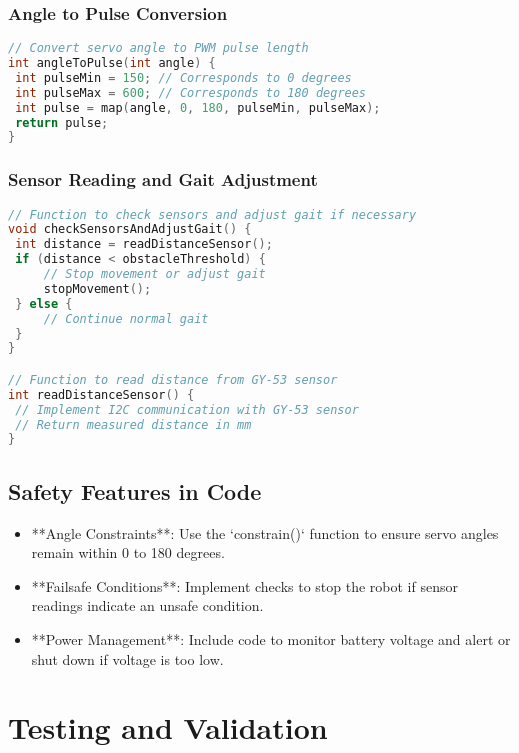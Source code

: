 \documentclass{article}
\begin{document}
\subsubsection{Angle to Pulse Conversion}

\begin{lstlisting}[language=C++, caption=Angle to Pulse Conversion]
// Convert servo angle to PWM pulse length
int angleToPulse(int angle) {
 int pulseMin = 150; // Corresponds to 0 degrees
 int pulseMax = 600; // Corresponds to 180 degrees
 int pulse = map(angle, 0, 180, pulseMin, pulseMax);
 return pulse;
}
\end{lstlisting}

\subsubsection{Sensor Reading and Gait Adjustment}

\begin{lstlisting}[language=C++, caption=Sensor Reading and Gait Adjustment]
// Function to check sensors and adjust gait if necessary
void checkSensorsAndAdjustGait() {
 int distance = readDistanceSensor();
 if (distance < obstacleThreshold) {
     // Stop movement or adjust gait
     stopMovement();
 } else {
     // Continue normal gait
 }
}

// Function to read distance from GY-53 sensor
int readDistanceSensor() {
 // Implement I2C communication with GY-53 sensor
 // Return measured distance in mm
}
\end{lstlisting}

\subsection{Safety Features in Code}

\begin{itemize}
 \item **Angle Constraints**: Use the `constrain()` function to ensure servo angles remain within 0 to 180 degrees.
 \item **Failsafe Conditions**: Implement checks to stop the robot if sensor readings indicate an unsafe condition.
 \item **Power Management**: Include code to monitor battery voltage and alert or shut down if voltage is too low.
\end{itemize}

\section{Testing and Validation}
\end{document}
